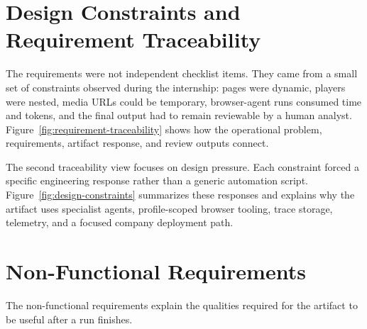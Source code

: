 \section{Design Constraints and Requirement Traceability}

The requirements were not independent checklist items. They came from a small set of
constraints observed during the internship: pages were dynamic, players were nested,
media URLs could be temporary, browser-agent runs consumed time and tokens, and the
final output had to remain reviewable by a human analyst. Figure~\ref{fig:requirement-traceability}
shows how the operational problem, requirements, artifact response, and review outputs
connect.



The second traceability view focuses on design pressure. Each constraint forced a
specific engineering response rather than a generic automation script. Figure~\ref{fig:design-constraints}
summarizes these responses and explains why the artifact uses specialist agents,
profile-scoped browser tooling, trace storage, telemetry, and a focused company
deployment path.



\section{Non-Functional Requirements}

The non-functional requirements explain the qualities required for the artifact to be
useful after a run finishes.

